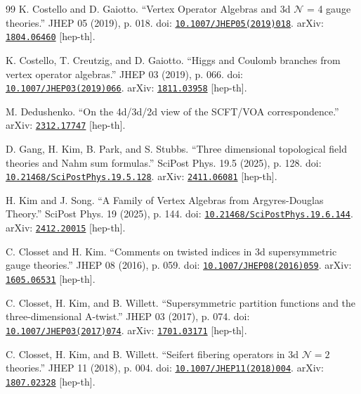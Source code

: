 \documentclass[11pt,a4paper]{article}
\numberwithin{equation}{section}
\begin{document}
\begin{thebibliography}{99}
K. Costello and D. Gaiotto. ``Vertex Operator Algebras and 3d $ \mathcal{N} $ = 4 gauge theories.'' JHEP 05 (2019), p. 018. doi: \href{https://doi.org/10.1007/JHEP05(2019)018}{\nolinkurl{10.1007/JHEP05(2019)018}}. arXiv: \href{https://arxiv.org/abs/1804.06460}{\nolinkurl{1804.06460}} [hep-th].

K. Costello, T. Creutzig, and D. Gaiotto. ``Higgs and Coulomb branches from vertex operator algebras.'' JHEP 03 (2019), p. 066. doi: \href{https://doi.org/10.1007/JHEP03(2019)066}{\nolinkurl{10.1007/JHEP03(2019)066}}. arXiv: \href{https://arxiv.org/abs/1811.03958}{\nolinkurl{1811.03958}} [hep-th].

M. Dedushenko. ``On the 4d/3d/2d view of the SCFT/VOA correspondence.'' arXiv: \href{https://arxiv.org/abs/2312.17747}{\nolinkurl{2312.17747}} [hep-th].

D. Gang, H. Kim, B. Park, and S. Stubbs. ``Three dimensional topological field theories and Nahm sum formulas.'' SciPost Phys. 19.5 (2025), p. 128. doi: \href{https://doi.org/10.21468/SciPostPhys.19.5.128}{\nolinkurl{10.21468/SciPostPhys.19.5.128}}. arXiv: \href{https://arxiv.org/abs/2411.06081}{\nolinkurl{2411.06081}} [hep-th].

H. Kim and J. Song. ``A Family of Vertex Algebras from Argyres-Douglas Theory.'' SciPost Phys. 19 (2025), p. 144. doi: \href{https://doi.org/10.21468/SciPostPhys.19.6.144}{\nolinkurl{10.21468/SciPostPhys.19.6.144}}. arXiv: \href{https://arxiv.org/abs/2412.20015}{\nolinkurl{2412.20015}} [hep-th].

C. Closset and H. Kim. ``Comments on twisted indices in 3d supersymmetric gauge theories.'' JHEP 08 (2016), p. 059. doi: \href{https://doi.org/10.1007/JHEP08(2016)059}{\nolinkurl{10.1007/JHEP08(2016)059}}. arXiv: \href{https://arxiv.org/abs/1605.06531}{\nolinkurl{1605.06531}} [hep-th].

C. Closset, H. Kim, and B. Willett. ``Supersymmetric partition functions and the three-dimensional A-twist.'' JHEP 03 (2017), p. 074. doi: \href{https://doi.org/10.1007/JHEP03(2017)074}{\nolinkurl{10.1007/JHEP03(2017)074}}. arXiv: \href{https://arxiv.org/abs/1701.03171}{\nolinkurl{1701.03171}} [hep-th].

C. Closset, H. Kim, and B. Willett. ``Seifert fibering operators in 3d $\mathcal{N}=2$ theories.'' JHEP 11 (2018), p. 004. doi: \href{https://doi.org/10.1007/JHEP11(2018)004}{\nolinkurl{10.1007/JHEP11(2018)004}}. arXiv: \href{https://arxiv.org/abs/1807.02328}{\nolinkurl{1807.02328}} [hep-th].


\end{thebibliography}
\end{document}
